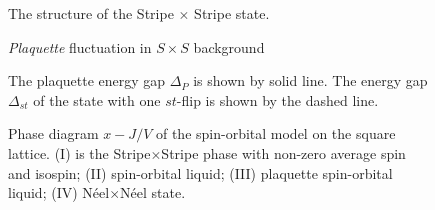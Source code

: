 \begin{twocolumn}

\begin{figure} [h]
\centerline{}
\vskip 5mm
\caption{The structure of the Stripe $\times$ Stripe state.}
\label{fig_stripe}
\end{figure}


\begin{figure} [h]
\centerline{}
\vskip 5mm
\caption{{\it Plaquette} fluctuation in $S\times S$ background}
\label{fig_plaquette}
\end{figure}

\begin{figure} [h]
\centerline{}
\caption{The plaquette energy gap $\Delta_P$
is shown by solid line. The energy gap $\Delta_{st}$ of the state 
with one $st$-flip is shown by the dashed line.
}
\label{fig_edefect}
\end{figure}


\begin{figure} [t]
\centerline{           }
\caption{
Phase diagram $x-J/V$ of the spin-orbital model on the square lattice.
(I) is the Stripe$\times$Stripe phase with non-zero average spin and 
isospin; (II) spin-orbital liquid; (III) plaquette spin-orbital liquid;
(IV) N\'eel$\times$N\'eel state.
}
\label{fig_phase}
\end{figure}

\end{twocolumn}




